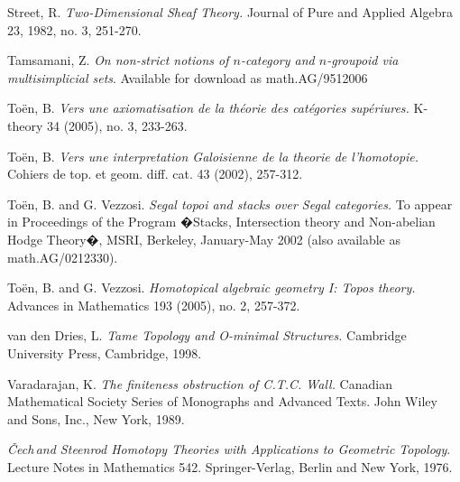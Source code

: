 \documentclass{report}[10pt, final]
\newcommand{\Cech}{\v{C}ech\,}
\theoremstyle{definition}
\begin{document}
\begin{EndMatter}
\begin{thebibliography}{99}
 Street, R. {\it Two-Dimensional Sheaf Theory.}
Journal of Pure and Applied Algebra 23, 1982, no. 3, 251-270.

 Tamsamani, Z. {\it On non-strict notions
of $n$-category and $n$-groupoid via multisimplicial sets}. Available for download as
math.AG/9512006

 To\"{e}n, B. {\it Vers une axiomatisation de la th\'{e}orie des cat\'{e}gories sup\'{e}riures.} K-theory 34 (2005), no. 3, 233-263.

 To\"{e}n, B. {\it Vers une interpretation Galoisienne de la theorie de l'homotopie.} Cohiers de top. et geom. diff. cat. 43 (2002), 257-312.

 To\"{e}n, B. and G. Vezzosi.
{\it Segal topoi and stacks over Segal categories.} To appear in Proceedings of the Program �Stacks, Intersection theory and Non-abelian Hodge Theory�, MSRI, Berkeley, January-May 2002 (also available as math.AG/0212330). 

 To\"{e}n, B. and G. Vezzosi. {\it Homotopical algebraic geometry I: Topos theory.} Advances in Mathematics 193 (2005), no. 2, 257-372.

 van den Dries, L. {\it Tame Topology and O-minimal
Structures.} Cambridge University Press, Cambridge, 1998.

 Varadarajan, K. {\it The finiteness obstruction of C.T.C. Wall.}
Canadian Mathematical Society Series of Monographs and Advanced Texts. John Wiley and Sons, Inc., New York, 1989.

 {\it \Cech and Steenrod Homotopy Theories
with Applications to Geometric Topology}. Lecture Notes in
Mathematics 542. Springer-Verlag, Berlin and New York, 1976.
\end{thebibliography}

\end{EndMatter}
\end{document}
